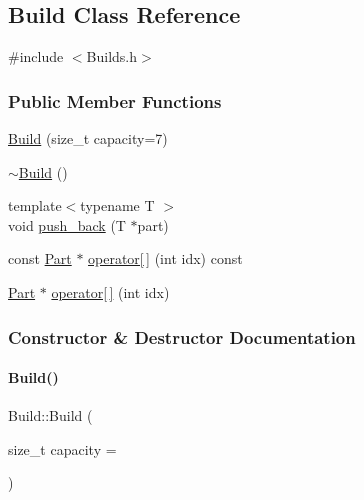 \subsection{Build Class Reference}
\label{class_build}


{\ttfamily \#include $<$Builds.\+h$>$}

\subsubsection*{Public Member Functions}
\begin{DoxyCompactItemize}
\item 
\mbox{\hyperlink{class_build_ab9b72c3479d483c0b452af30bb544de8}{Build}} (size\+\_\+t capacity=7)
\item 
\mbox{\hyperlink{class_build_a8f1d400e9bc158b6339cc1785b18d07b}{$\sim$\+Build}} ()
\item 
{\footnotesize template$<$typename T $>$ }\\void \mbox{\hyperlink{class_build_aba0548391a8c613ed2a9d81d4d3b2a4b}{push\+\_\+back}} (T $\ast$part)
\item 
const \mbox{\hyperlink{class_part}{Part}} $\ast$ \mbox{\hyperlink{class_build_af3e03ed173016d7ff348d1e7057bd97c}{operator\mbox{[}$\,$\mbox{]}}} (int idx) const
\item 
\mbox{\hyperlink{class_part}{Part}} $\ast$ \mbox{\hyperlink{class_build_aa48e871d88c60272ab5f6cd5b97aaad0}{operator\mbox{[}$\,$\mbox{]}}} (int idx)
\end{DoxyCompactItemize}


\subsubsection{Constructor \& Destructor Documentation}
\mbox{\label{class_build_ab9b72c3479d483c0b452af30bb544de8}} 
\paragraph{\texorpdfstring{Build()}{Build()}}
{\footnotesize\ttfamily Build\+::\+Build (\begin{DoxyParamCaption}\item[{size\+\_\+t}]{capacity = {} }\end{DoxyParamCaption})\hspace{0.3cm}{\ttfamily [inline]}}

\mbox{\label{class_build_a8f1d400e9bc158b6339cc1785b18d07b}} 
